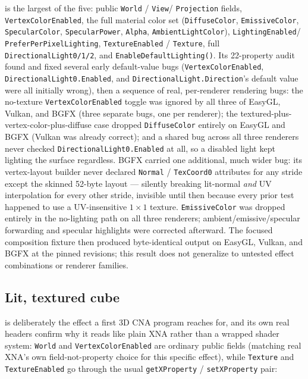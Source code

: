  is the largest of the five: public \texttt{World} / \texttt{View}/%
\texttt{Projection} fields, \texttt{VertexColorEnabled}, the full material color set
(\texttt{DiffuseColor}, \texttt{EmissiveColor}, \texttt{SpecularColor}, \texttt{SpecularPower},
\texttt{Alpha}, \texttt{AmbientLightColor}), \texttt{LightingEnabled}/%
\texttt{PreferPerPixelLighting}, \texttt{TextureEnabled} / \texttt{Texture}, full
\texttt{DirectionalLight0/1/2}, and \texttt{EnableDefaultLighting()}. Its 22-property audit
found and fixed several early default-value bugs (\texttt{VertexColorEnabled},
\texttt{DirectionalLight0.Enabled}, and \texttt{DirectionalLight.Direction}'s default value
were all initially wrong), then a sequence of real, per-renderer rendering bugs: the
no-texture \texttt{VertexColorEnabled} toggle was ignored by all three of EasyGL, Vulkan, and
BGFX (three separate bugs, one per renderer); the textured-plus-vertex-color-plus-diffuse case
dropped \texttt{DiffuseColor} entirely on EasyGL and BGFX (Vulkan was already correct); and a
shared bug across all three renderers never checked \texttt{DirectionalLight0.Enabled} at all,
so a disabled light kept lighting the surface regardless. BGFX carried one additional,
much wider bug: its vertex-layout builder never declared \texttt{Normal} / \texttt{TexCoord0}
attributes for any stride except the skinned 52-byte layout --- silently breaking lit-normal
\emph{and} UV interpolation for every other stride, invisible until then because every prior
test happened to use a UV-insensitive $1\times1$ texture. \texttt{EmissiveColor} was dropped
entirely in the no-lighting path on all three renderers; ambient/emissive/specular forwarding
and specular highlights were corrected afterward. The focused composition fixture then produced
byte-identical output on EasyGL, Vulkan, and BGFX at the pinned revisions; this result does not
generalize to untested effect combinations or renderer families.

\subsection{Lit, textured cube}

 is deliberately the effect a first 3D CNA program reaches for, and its
own real headers confirm why it reads like plain XNA rather than a wrapped shader system:
\texttt{World} and \texttt{VertexColorEnabled} are ordinary public fields (matching real XNA's
own field-not-property choice for this specific effect), while \texttt{Texture} and
\texttt{TextureEnabled} go through the usual \texttt{getXProperty} / \texttt{setXProperty} pair:

